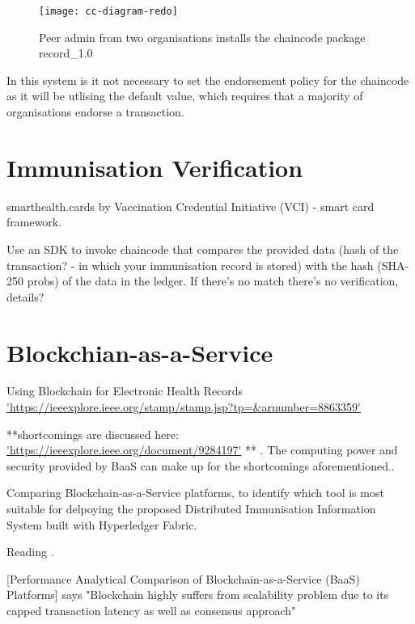 \begin{figure}[H]
  \texttt{[image: cc-diagram-redo]}
  \caption{Peer admin from two organisations installs the chaincode package record\_1.0}
\end{figure}

In this system is it not necessary to set the endorsement policy for the chaincode as it will be utlising the default value, which requires that a majority of organisations endorse a transaction. \cite{noauthor_fabric_nodate}

\section{Immunisation Verification}
smarthealth.cards by Vaccination Credential Initiative (VCI) - smart card framework.\linebreak[1]

Use an SDK to invoke chaincode that compares the provided data (hash of the transaction? - in which your immunisation record is stored) with the hash (SHA-250 probs) of the data in the ledger. If there's no match there's no verification, details?

\section{Blockchian-as-a-Service}

Using Blockchain for Electronic Health Records \url{'https://ieeexplore.ieee.org/stamp/stamp.jsp?tp=&arnumber=8863359'} \cite{shahnaz_using_2019} 


**shortcomings are discussed here: \url{'https://ieeexplore.ieee.org/document/9284197'} \cite{brotsis_security_2020} ** . The computing power and security provided by BaaS can make up for the shortcomings aforementioned.\cite{song_research_2021}.

Comparing Blockchain-as-a-Service platforms, to identify which tool is most suitable for delpoying the proposed Distributed Immunisation Information System built with Hyperledger Fabric.\linebreak[1]

Reading \cite{onik_performance_2019}.\linebreak[1]

[Performance Analytical Comparison of Blockchain-as-a-Service (BaaS) Platforms] says "Blockchain highly suffers from scalability problem due to its capped transaction
latency as well as consensus approach"\linebreak[1]

